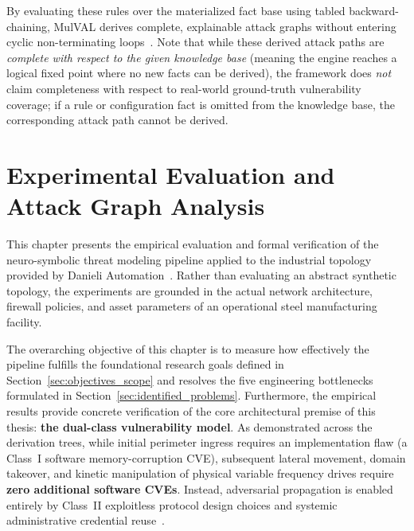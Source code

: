 \documentclass[target=mst,aauheader=aics,style=]{thud}
\begin{document}
By evaluating these rules over the materialized fact base using tabled backward-chaining, MulVAL derives complete, explainable attack graphs without entering cyclic non-terminating loops~\cite{Ou05, swift2012xsb}. Note that while these derived attack paths are \textit{complete with respect to the given knowledge base} (meaning the engine reaches a logical fixed point where no new facts can be derived), the framework does \textit{not} claim completeness with respect to real-world ground-truth vulnerability coverage; if a rule or configuration fact is omitted from the knowledge base, the corresponding attack path cannot be derived.

\chapter{Experimental Evaluation and Attack Graph Analysis}
\label{chap:evaluation}

This chapter presents the empirical evaluation and formal verification of the neuro-symbolic threat modeling pipeline applied to the industrial topology provided by Danieli Automation~\cite{SunderOT}. Rather than evaluating an abstract synthetic topology, the experiments are grounded in the actual network architecture, firewall policies, and asset parameters of an operational steel manufacturing facility.

The overarching objective of this chapter is to measure how effectively the pipeline fulfills the foundational research goals defined in Section~\ref{sec:objectives_scope} and resolves the five engineering bottlenecks formulated in Section~\ref{sec:identified_problems}. Furthermore, the empirical results provide concrete verification of the core architectural premise of this thesis: \textbf{the dual-class vulnerability model}. As demonstrated across the derivation trees, while initial perimeter ingress requires an implementation flaw (a Class~I software memory-corruption CVE), subsequent lateral movement, domain takeover, and kinetic manipulation of physical variable frequency drives require \textbf{zero additional software CVEs}. Instead, adversarial propagation is enabled entirely by Class~II exploitless protocol design choices and systemic administrative credential reuse~\cite{StanExtended, SunderOT}.

\end{document}
